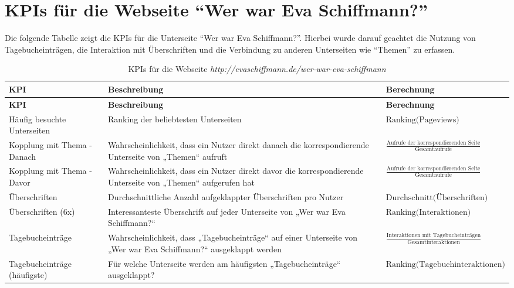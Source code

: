 \section{KPIs für die Webseite ``Wer war Eva Schiffmann?''}
Die folgende Tabelle zeigt die KPIs für die Unterseite ``Wer war Eva Schiffmann?''. Hierbei wurde darauf geachtet die Nutzung von Tagebucheinträgen, die Interaktion mit Überschriften und die Verbindung zu anderen Unterseiten wie ``Themen'' zu erfassen.

\renewcommand{\arraystretch}{1.5} %
\begin{xltabular}{\textwidth}{|X|X|X|}
    \caption{KPIs für die Webseite \textit{http://evaschiffmann.de/wer-war-eva-schiffmann}} \label{tab:kpi_eva_schiffmann} \\
    \hline
    \textbf{KPI} & \textbf{Beschreibung} & \textbf{Berechnung} \\ \hline
    \endfirsthead

    \hline
    \textbf{KPI} & \textbf{Beschreibung} & \textbf{Berechnung} \\ \hline
    \endhead

    \hline
    \endfoot

    \hline
    \endlastfoot

    Häufig besuchte Unterseiten & Ranking der beliebtesten Unterseiten & {\footnotesize \(\text{Ranking(Pageviews)}\)} \\ \hline
    Kopplung mit Thema - Danach & Wahrscheinlichkeit, dass ein Nutzer direkt danach die korrespondierende Unterseite von „Themen“ aufruft & {\footnotesize \(\frac{\text{Aufrufe der korrespondierenden Seite}}{\text{Gesamtaufrufe}}\)} \\ \hline
    Kopplung mit Thema - Davor & Wahrscheinlichkeit, dass ein Nutzer direkt davor die korrespondierende Unterseite von „Themen“ aufgerufen hat & {\footnotesize \(\frac{\text{Aufrufe der korrespondierenden Seite}}{\text{Gesamtaufrufe}}\)} \\ \hline
    Überschriften & Durchschnittliche Anzahl aufgeklappter Überschriften pro Nutzer & {\footnotesize \(\text{Durchschnitt(Überschriften)}\)} \\ \hline
    Überschriften (6x) & Interessanteste Überschrift auf jeder Unterseite von „Wer war Eva Schiffmann?“ & {\footnotesize \(\text{Ranking(Interaktionen)}\)} \\ \hline
    Tagebucheinträge & Wahrscheinlichkeit, dass „Tagebucheinträge“ auf einer Unterseite von „Wer war Eva Schiffmann?“ ausgeklappt werden & {\footnotesize \(\frac{\text{Interaktionen mit Tagebucheinträgen}}{\text{Gesamtinteraktionen}}\)} \\ \hline
    Tagebucheinträge (häufigste) & Für welche Unterseite werden am häufigsten „Tagebucheinträge“ ausgeklappt? & {\footnotesize \(\text{Ranking(Tagebuchinteraktionen)}\)} \\ \hline
\end{xltabular}

